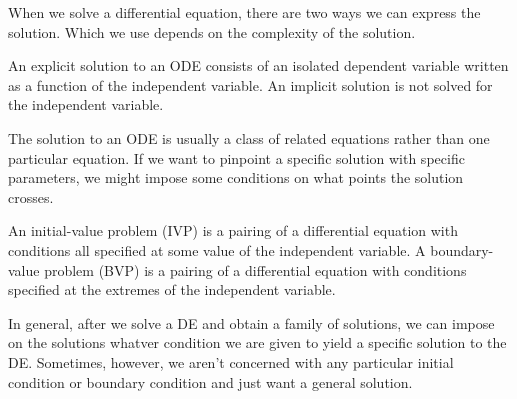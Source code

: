 \documentclass[../m82main.tex]{subfiles}
\begin{document}
When we solve a differential equation, there are two ways we can express the solution.
Which we use depends on the complexity of the solution.

\begin{definition}
    An explicit solution to an ODE consists of an isolated dependent variable written as a function of the independent variable.
    An implicit solution is not solved for the independent variable.
\end{definition}

The solution to an ODE is usually a class of related equations rather than one particular equation.
If we want to pinpoint a specific solution with specific parameters, we might impose some conditions on what points the solution crosses.

\begin{definition}
    An initial-value problem (IVP) is a pairing of a differential equation with conditions all specified at some value of the independent variable.
    A boundary-value problem (BVP) is a pairing of a differential equation with conditions specified at the extremes of the independent variable.
\end{definition}

In general, after we solve a DE and obtain a family of solutions, we can impose on the solutions whatver condition we are given to yield a specific solution to the DE.
Sometimes, however, we aren't concerned with any particular initial condition or boundary condition and just want a general solution.
\end{document}
